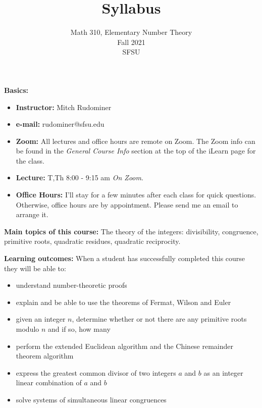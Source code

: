 \documentclass[oneside,12pt]{amsart}
\begin{document}
\title{Syllabus}
\author{Math 310, Elementary Number Theory  \\ Fall 2021 \\ SFSU }
\date{}

\maketitle

\textbf{Basics:}
\begin{itemize}
\item \textbf{Instructor:} Mitch Rudominer
\item \textbf{e-mail:} rudominer@sfsu.edu
\item \textbf{Zoom:} All lectures and office hours are remote on Zoom. The Zoom info can be found in the \emph{General Course Info} section at the top of the iLearn
page for the class.
\item \textbf{Lecture:}  T,Th 8:00 - 9:15 am \emph{On Zoom}.
\item \textbf{Office Hours:} I'll stay for a few minutes after each class for quick questions. Otherwise, office hours are by appointment.
Please send me an email to arrange it.
\end{itemize}

\bigskip

\textbf{Main topics of this course:}
The theory of the integers: divisibility, congruence,
primitive roots, quadratic residues, quadratic reciprocity.

\bigskip

\textbf{Learning outcomes:}
When a student has successfully completed this course they will be able to:
\begin{itemize}
\item understand number-theoretic proofs
\item explain and be able to use the theorems of Fermat, Wilson and Euler
\item given an integer $n$, determine whether or not there are any primitive
roots modulo $n$ and if so, how many
\item perform the extended Euclidean algorithm and the Chinese remainder theorem algorithm
\item express the greatest common divisor of two integers $a$ and $b$ as an integer
linear combination of $a$ and $b$
\item solve systems of simultaneous linear congruences
\end{itemize}

\bigskip
\end{document}
